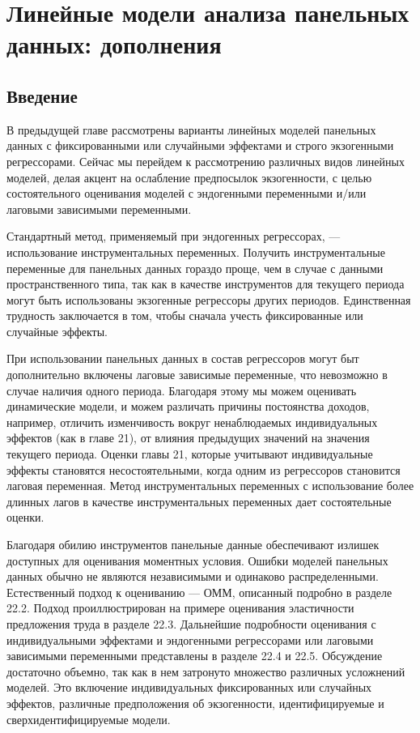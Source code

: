 
\chapter{Линейные модели анализа панельных данных: дополнения}

\section{Введение}
В предыдущей главе рассмотрены варианты линейных моделей панельных данных с фиксированными или случайными эффектами и строго экзогенными регрессорами. Сейчас мы перейдем к рассмотрению различных видов линейных моделей, делая акцент на ослабление предпосылок экзогенности, с целью состоятельного оценивания моделей с эндогенными переменными и/или лаговыми зависимыми переменными.

Стандартный метод, применяемый при эндогенных регрессорах, --- использование инструментальных переменных. Получить инструментальные переменные для панельных данных гораздо проще, чем в случае с данными пространственного типа, так как в качестве инструментов для текущего периода могут быть использованы экзогенные регрессоры других периодов. Единственная трудность заключается в том, чтобы сначала учесть фиксированные или случайные эффекты.

При использовании панельных данных в состав регрессоров могут быт дополнительно включены лаговые зависимые переменные, что невозможно в случае наличия одного периода. Благодаря этому мы можем оценивать динамические модели, и можем различать причины постоянства доходов, например, отличить изменчивость вокруг ненаблюдаемых индивидуальных эффектов (как в главе 21), от влияния предыдущих значений на значения текущего периода. Оценки главы 21, которые учитывают индивидуальные  эффекты становятся несостоятельными, когда одним из регрессоров становится лаговая переменная. Метод инструментальных переменных с использование более длинных лагов в качестве инструментальных переменных дает состоятельные оценки.

Благодаря обилию инструментов панельные данные обеспечивают излишек доступных для оценивания моментных условия. Ошибки моделей панельных данных обычно не являются независимыми и одинаково распределенными. Естественный подход к оцениванию --- ОММ, описанный подробно в разделе 22.2. Подход проиллюстрирован на примере оценивания эластичности предложения труда в разделе 22.3. Дальнейшие подробности оценивания с индивидуальными эффектами и эндогенными регрессорами или лаговыми зависимыми переменными представлены в разделе 22.4 и 22.5. Обсуждение достаточно объемно, так как в нем затронуто множество различных усложнений моделей. Это включение индивидуальных фиксированных или случайных эффектов, различные предположения об экзогенности, идентифицируемые и сверхидентифицируемые модели.

